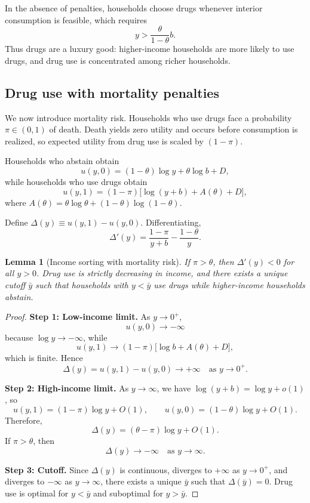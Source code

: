 \documentclass[parskip=full]{article}
\theoremstyle{plain}      %
\newtheorem{lemma}{Lemma}
\theoremstyle{remark}    %
\begin{document}
In the absence of penalties, households choose drugs whenever interior consumption is feasible, which requires
\[y > \frac{\theta}{1-\theta} b.\]
Thus drugs are a luxury good: higher-income households are more likely to use drugs, and drug use is concentrated among richer households.

\subsection{Drug use with mortality penalties}

We now introduce mortality risk. Households who use drugs face a probability $\pi\in(0,1)$ of death. Death yields zero utility and occurs before consumption is realized, so expected utility from drug use is scaled by $(1-\pi)$.

Households who abstain obtain
\[u(y,0)=(1-\theta)\log y + \theta\log b + D,\]
while households who use drugs obtain
\[u(y,1)=(1-\pi)\big[\log(y+b)+A(\theta)+D\big],\]
where $A(\theta)=\theta\log\theta+(1-\theta)\log(1-\theta)$.

Define $\Delta(y)\equiv u(y,1)-u(y,0)$. Differentiating,
\[\Delta'(y)=\frac{1-\pi}{y+b}-\frac{1-\theta}{y}.\]

\begin{lemma}[Income sorting with mortality risk]
If $\pi>\theta$, then $\Delta'(y)<0$ for all $y>0$. Drug use is strictly decreasing in income, and there exists a unique cutoff $\bar y$ such that households with $y<\bar y$ use drugs while higher-income households abstain.
\end{lemma}

\begin{proof}
\noindent\textbf{Step 1: Low-income limit.}
As $y\to 0^+$,
\[u(y,0)\to -\infty\]
because $\log y\to -\infty$, while
\[u(y,1)\to (1-\pi)\big[\log b + A(\theta)+D\big],\]
which is finite. Hence
\[\Delta(y)=u(y,1)-u(y,0)\to +\infty \quad \text{as } y\to 0^+.\]

\medskip
\noindent\textbf{Step 2: High-income limit.}
As $y\to\infty$, we have $\log(y+b)=\log y+o(1)$, so
\[u(y,1)=(1-\pi)\log y + O(1),
\qquad u(y,0)=(1-\theta)\log y + O(1).\]
Therefore,
\[\Delta(y)=(\theta-\pi)\log y + O(1).\]
If $\pi>\theta$, then 
\[\Delta(y)\to -\infty \quad \text{as } y\to\infty.\]

\medskip
\noindent\textbf{Step 3: Cutoff.}
Since $\Delta(y)$ is continuous, diverges to $+\infty$ as $y\to 0^+$,
and diverges to $-\infty$ as $y\to\infty$, there exists a unique
$\bar y$ such that $\Delta(\bar y)=0$. Drug use is optimal for
$y<\bar y$ and suboptimal for $y>\bar y$.
\end{proof}
\end{document}
